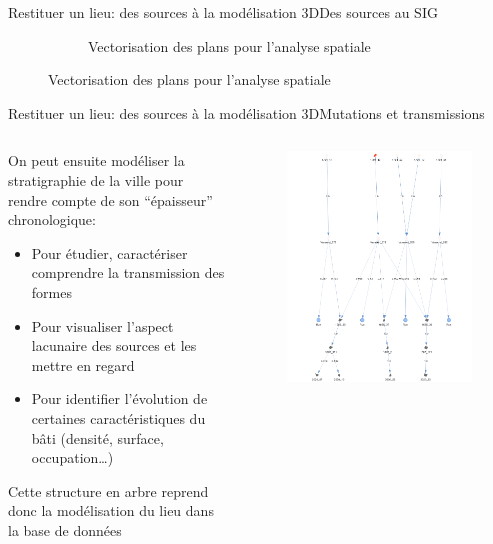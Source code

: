\documentclass[8pt]{beamer}
\begin{document}
\begin{frame}{Restituer un lieu: des sources à la modélisation 3D}{Des sources au SIG}
\begin{figure}
\begin{subfigure}{0.48\textwidth}
			\caption{Vectorisation des plans pour l’analyse spatiale}
		\end{subfigure}
	\end{figure}
\end{frame}

\begin{frame}{Restituer un lieu: des sources à la modélisation 3D}{Mutations et transmissions}
	\begin{columns}[c]
		\begin{column}{0.5\textwidth}
			On peut ensuite modéliser la stratigraphie de la ville pour rendre compte de son \enquote{épaisseur} chronologique:
			\begin{itemize}
				\item Pour étudier, caractériser comprendre la transmission des formes
				\item Pour visualiser l’aspect lacunaire des sources et les mettre en regard
				\item Pour identifier l’évolution de certaines caractéristiques du bâti (densité, surface, occupation…)
			\end{itemize}
			Cette structure en arbre reprend donc la modélisation du lieu dans la base de données
		\end{column}
		\begin{column}{0.5\textwidth}
			\begin{figure}
				\includegraphics[width=\textwidth]{includes/c_slide3.png}

\end{figure}
\end{column}
\end{columns}
\end{frame}
\end{document}
